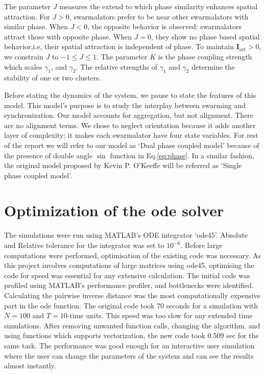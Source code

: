 \documentclass[twocolumn,10pt]{asme2ej}
\begin{document}
{    The parameter \(J\) measures the extend to which phase similarity enhances spatial attraction. For $J>0$, swarmalators prefer to be near other swarmalators with  similar phase. When $J<0$, the opposite behavior is observed: swarmalators attract those with opposite phase. When $J=0$, they show no phase based spatial behavior,i.e, their spatial attraction is independent of phase. To maintain $\mathbf{I}_{att}> 0$, we constrain $J$ to $-1 \leq J \leq 1$. The parameter $K$ is the phase coupling strength which scales $\gamma_1$, and $\gamma_2$. The relative  strengths of $\gamma_1$ and $\gamma_2$ determine the stability of one or two clusters. 
    
    Before stating the dynamics of the system, we pause to state the features of this model. This model's purpose is to study the interplay between swarming and synchronization. Our model accounts for aggregation, but not alignment. There are no alignment terms.  We chose to neglect orientation because it adds another layer of complexity; it makes each swarmalator have four state variables. For rest of the report we will refer to our model as `Dual phase coupled model' because of the presence of double angle $\sin$ function in Eq.\ref{eq:phase}. In a similar fashion, the original model proposed by Kevin P. O'Keeffe will be referred as `Single phase coupled model'.\noindent
}
\section{Optimization of the ode solver}
{
    The simulations were run using MATLAB's ODE integrator `ode45'. Absolute and Relative tolerance for the integrator was set to $10^{-6}$. Before large computations were performed, optimisation of the existing code was necessary. As this project involves computations of large matrices using ode45, optimising the code for speed was essential for any extensive calculation. The initial code was profiled using MATLAB's performance profiler, and bottlenecks were identified. Calculating the pairwise inverse distance was the most computationally expensive part in the ode function. The original code took 70 seconds for a simulation with $N = 100$ and $T = 10$-time units. This speed was too slow for any extended time simulations. After removing unwanted function calls, changing the algorithm, and using functions which supports vectorization, the new code took 0.509 sec for the same task. The performance was good enough for an interactive user simulation where the user can change the parameters of the system and can see the results almost instantly.
}
\end{document}
